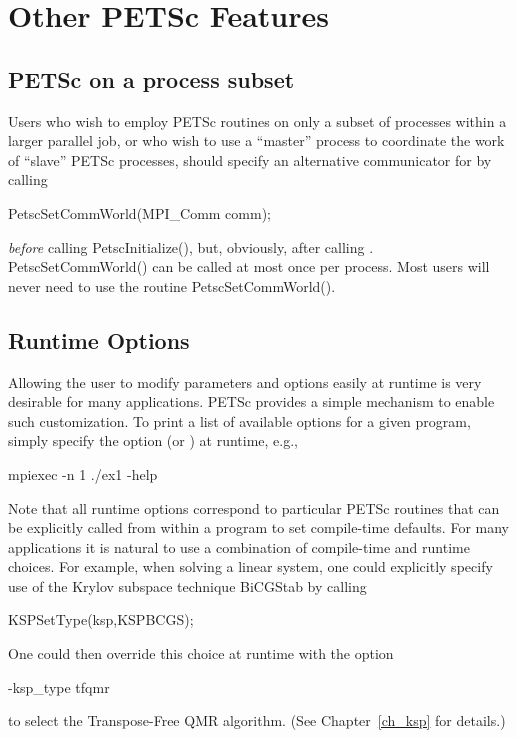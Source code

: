 {{%
\cleardoublepage
\chapter{Other PETSc Features}

\section{PETSc on a process subset}

Users who wish to employ PETSc routines on only a subset
of processes within a larger parallel job, or who wish to use a
``master'' process to coordinate the work of ``slave'' PETSc
processes, should specify an alternative communicator for  by calling
\begin{tabbing}
  PetscSetCommWorld(MPI\_Comm comm);
\end{tabbing}
{\em before} calling PetscInitialize(), but, obviously, after
calling . PetscSetCommWorld() can be called
at most once per process. Most users will never need to use the routine
PetscSetCommWorld().

\section{Runtime Options}  
\label{sec_options}

Allowing the user to modify parameters and options easily at runtime
is very desirable for many applications.  PETSc provides a simple
mechanism to enable such customization.  To print a list of
available options for a given program, simply specify the option
 (or ) at runtime, e.g.,  
\begin{tabbing}
    mpiexec -n 1 ./ex1 -help
\end{tabbing}

Note that all runtime options correspond to particular PETSc routines
that can be explicitly called from within a program to set compile-time
defaults.   For many applications it is natural to use a combination
of compile-time and runtime choices.  For example, when solving a linear
system, one could explicitly specify use of the Krylov subspace
technique BiCGStab by calling
\begin{tabbing}
   KSPSetType(ksp,KSPBCGS);
\end{tabbing}
One could then override this choice at runtime with the option
\begin{tabbing}
    -ksp\_type tfqmr
\end{tabbing}
to select the Transpose-Free QMR algorithm. (See Chapter~\ref{ch_ksp} for details.)

}}
